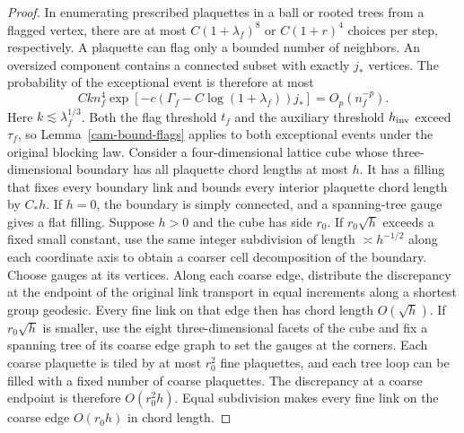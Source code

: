\documentclass[11pt,a4paper]{article}
\numberwithin{equation}{section}
\begin{document}
\begin{proof}
In enumerating prescribed plaquettes in a ball or rooted trees from a flagged vertex, there are at most \(C(1+\lambda_f)^8\) or \(C(1+r)^4\) choices per step, respectively. A plaquette can flag only a bounded number of neighbors. An oversized component contains a connected subset with exactly \(j_*\) vertices. The probability of the exceptional event is therefore at most
\[
 Ckn_f^4\exp[-c(\Gamma_f-C\log(1+\lambda_f))j_*]
 =O_p(n_f^{-p}).
\]
Here \(k\lesssim\lambda_f^{1/3}\). Both the flag threshold \(t_f\) and the auxiliary threshold \(h_{\rm inv}\) exceed \(\tau_f\), so Lemma~\ref{cam-bound-flags} applies to both exceptional events under the original blocking law.
Consider a four-dimensional lattice cube whose three-dimensional boundary has all plaquette chord lengths at most \(h\). It has a filling that fixes every boundary link and bounds every interior plaquette chord length by \(C_*h\). If \(h=0\), the boundary is simply connected, and a spanning-tree gauge gives a flat filling. Suppose \(h>0\) and the cube has side \(r_0\). If \(r_0\sqrt h\) exceeds a fixed small constant, use the same integer subdivision of length \(\asymp h^{-1/2}\) along each coordinate axis to obtain a coarser cell decomposition of the boundary. Choose gauges at its vertices. Along each coarse edge, distribute the discrepancy at the endpoint of the original link transport in equal increments along a shortest group geodesic. Every fine link on that edge then has chord length \(O(\sqrt h)\). If \(r_0\sqrt h\) is smaller, use the eight three-dimensional facets of the cube and fix a spanning tree of its coarse edge graph to set the gauges at the corners. Each coarse plaquette is tiled by at most \(r_0^2\) fine plaquettes, and each tree loop can be filled with a fixed number of coarse plaquettes. The discrepancy at a coarse endpoint is therefore \(O(r_0^2h)\). Equal subdivision makes every fine link on the coarse edge \(O(r_0h)\) in chord length.


\end{proof}
\end{document}
